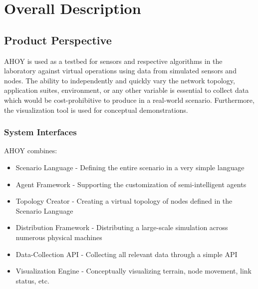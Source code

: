\documentclass[titlepage]{article}
\begin{document}

\section{Overall Description%
  \label{overall-description}%
}


\subsection{Product Perspective%
  \label{product-perspective}%
}

AHOY is used as a testbed for sensors and respective algorithms in the laboratory against virtual operations using data from simulated sensors and nodes. The ability to independently and quickly vary the network topology, application suites, environment, or any other variable is essential to collect data which would be cost-prohibitive to produce in a real-world scenario. Furthermore, the visualization tool is used for conceptual demonstrations.


\subsubsection{System Interfaces%
  \label{system-interfaces}%
}

AHOY combines:
\begin{itemize}
    \item Scenario Language - Defining the entire scenario in a very simple language
    \item Agent Framework - Supporting the customization of semi-intelligent agents
    \item Topology Creator - Creating a virtual topology of nodes defined in the Scenario Language
    \item Distribution Framework - Distributing a large-scale simulation across numerous physical machines
    \item Data-Collection API - Collecting all relevant data through a simple API
    \item Visualization Engine - Conceptually visualizing terrain, node movement, link status, etc.
\end{itemize}
\end{document}
